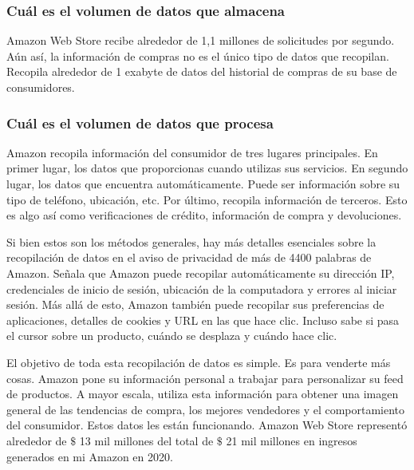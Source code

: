 \subsubsection{Cuál es el volumen de datos que almacena}
Amazon Web Store recibe alrededor de 1,1 millones de solicitudes por segundo. Aún así, la información de compras no es el único tipo de datos que recopilan. Recopila alrededor de 1 exabyte de datos del historial de compras de su base de consumidores.

\subsubsection{Cuál es el volumen de datos que procesa}
Amazon recopila información del consumidor de tres lugares principales. En primer lugar, los datos que proporcionas cuando utilizas sus servicios. En segundo lugar, los datos que encuentra automáticamente. Puede ser información sobre su tipo de teléfono, ubicación, etc. Por último, recopila información de terceros. Esto es algo así como verificaciones de crédito, información de compra y devoluciones.

Si bien estos son los métodos generales, hay más detalles esenciales sobre la recopilación de datos en el aviso de privacidad de más de 4400 palabras de Amazon. Señala que Amazon puede recopilar automáticamente su dirección IP, credenciales de inicio de sesión, ubicación de la computadora y errores al iniciar sesión. Más allá de esto, Amazon también puede recopilar sus preferencias de aplicaciones, detalles de cookies y URL en las que hace clic. Incluso sabe si pasa el cursor sobre un producto, cuándo se desplaza y cuándo hace clic.

El objetivo de toda esta recopilación de datos es simple. Es para venderte más cosas. Amazon pone su información personal a trabajar para personalizar su feed de productos. A mayor escala, utiliza esta información para obtener una imagen general de las tendencias de compra, los mejores vendedores y el comportamiento del consumidor. Estos datos les están funcionando. Amazon Web Store representó alrededor de $\$$ 13 mil millones del total de $\$$ 21 mil millones en ingresos generados en mi Amazon en 2020.
\clearpage

